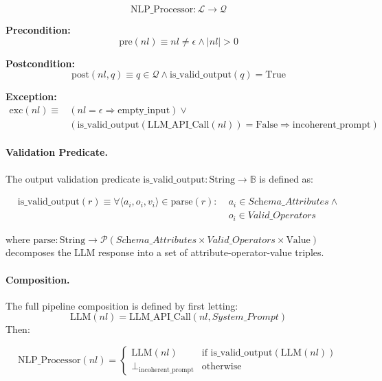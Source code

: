 \documentclass[12pt, titlepage]{article}
\begin{document}
\[
\text{NLP\_Processor} : \mathcal{L} \rightarrow \mathcal{Q}
\]

\noindent \textbf{Precondition:}
\[
\text{pre}(nl) \equiv nl \neq \epsilon \land |nl| > 0
\]

\noindent \textbf{Postcondition:}
\[
\text{post}(nl, q) \equiv q \in \mathcal{Q} \land \text{is\_valid\_output}(q) = \text{True}
\]

\noindent \textbf{Exception:}
\begin{align*}
\text{exc}(nl) \equiv &(nl = \epsilon \Rightarrow \text{empty\_input}) \lor \\
                      &(\text{is\_valid\_output}(\text{LLM\_API\_Call}(nl)) = \text{False} \Rightarrow \text{incoherent\_prompt})
\end{align*}

\paragraph{Validation Predicate.}

The output validation predicate $\text{is\_valid\_output} : \text{String} \rightarrow \mathbb{B}$ is defined as:

\begin{align*}
\text{is\_valid\_output}(r) \equiv \forall \langle a_i, o_i, v_i \rangle \in \text{parse}(r) : \;&a_i \in \textit{Schema\_Attributes} \land \\
                                                                                              &o_i \in \textit{Valid\_Operators}
\end{align*}

where $\text{parse} : \text{String} \rightarrow \mathcal{P}(\textit{Schema\_Attributes} \times \textit{Valid\_Operators} \times \text{Value})$ decomposes the LLM response into a set of attribute-operator-value triples.

\paragraph{Composition.}

The full pipeline composition is defined by first letting:
\[ \text{LLM}(nl) = \text{LLM\_API\_Call}(nl, \textit{System\_Prompt}) \]
Then:

\[
\text{NLP\_Processor}(nl) = \begin{cases}
  \text{LLM}(nl) & \text{if } \text{is\_valid\_output}(\text{LLM}(nl)) \\
  \bot_{\text{incoherent\_prompt}} & \text{otherwise}
\end{cases}
\]
\end{document}
